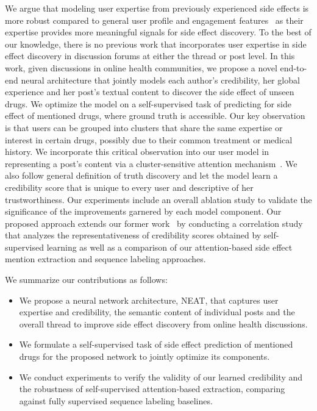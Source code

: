 \documentclass{bmcart}
\begin{document}
We argue that modeling user expertise from previously experienced side effects is more robust compared to general user profile and engagement features~\cite{mukherjee2014people,vydiswaran2019identifying} as their expertise provides more meaningful signals for side effect discovery.
To the best of our knowledge, there is no previous work that incorporates user expertise in side effect discovery in discussion forums at either the thread or post level.
In this work, given discussions in online health communities, we propose a novel end-to-end neural architecture that jointly models each author's credibility, her global experience and her post's textual content to discover the side effect of unseen drugs.
We optimize the model on a self-supervised task of predicting for side effect of mentioned drugs, where ground truth is accessible.  
Our key observation is that users can be grouped into clusters 
that share the same expertise or interest in certain drugs, 
possibly due to their common treatment or medical history. 
We incorporate this critical observation into our user model in representing a post's content via a cluster-sensitive attention mechanism~\cite{halder2018cold}.
We also follow general definition of truth discovery and let the
model learn a credibility score that is unique to every user and
descriptive of her trustworthiness.
Our experiments include an overall ablation study to validate the significance of the improvements garnered by each model component. Our proposed approach extends 
our former work~\cite{nguyen-etal-2018-treatment}  
by conducting a correlation study that analyzes the representativeness of 
credibility scores obtained by self-supervised learning  
as well as a comparison of our attention-based side effect mention extraction and sequence labeling approaches.

We summarize our contributions as follows: 
\begin{itemize}
\item We propose a neural network architecture, NEAT, that captures user expertise and credibility, the semantic content of individual posts and the overall thread to improve side effect discovery from online health discussions.
\item We formulate a self-supervised task of side effect prediction of mentioned drugs for the proposed network to jointly optimize its components.
\item We conduct experiments to verify the validity of our learned credibility and the robustness of self-supervised attention-based extraction, comparing against fully supervised sequence labeling baselines.
\end{itemize}
\end{document}
